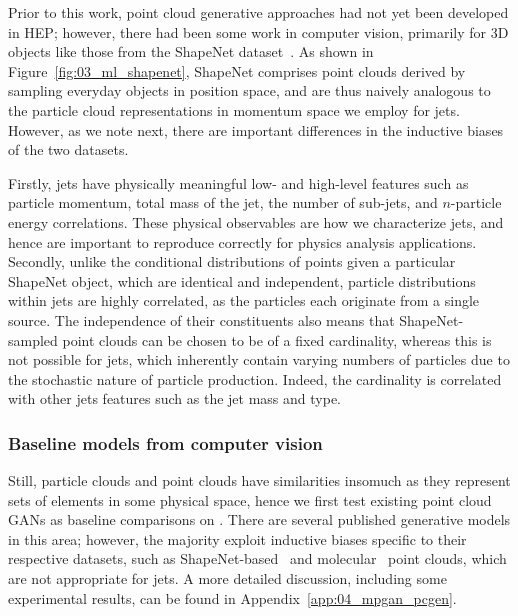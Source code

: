 Prior to this work, point cloud generative approaches had not yet been developed in HEP; however, there had been some work in computer vision, primarily for 3D objects like those from the ShapeNet dataset~\cite{shapenet}.
As shown in Figure~\ref{fig:03_ml_shapenet}, ShapeNet comprises point clouds derived by sampling everyday objects in position space, and are thus naively analogous to the particle cloud representations in momentum space we employ for jets.
However, as we note next, there are important differences in the inductive biases of the two datasets.

Firstly, jets have physically meaningful low- and high-level features such as particle momentum, total mass of the jet, the number of sub-jets, and $n$-particle energy correlations.
These physical observables are how we characterize jets, and hence are important to reproduce correctly for physics analysis applications.
Secondly, unlike the conditional distributions of points given a particular ShapeNet object, which are identical and independent, particle distributions within jets are highly correlated, as the particles each originate from a single source.
The independence of their constituents also means that ShapeNet-sampled point clouds can be chosen to be of a fixed cardinality, whereas this is not possible for jets, which inherently contain varying numbers of particles due to the stochastic nature of particle production.
Indeed, the cardinality is correlated with other jets features such as the jet mass and type.

\subsubsection{Baseline models from computer vision}

Still, particle clouds and point clouds have similarities insomuch as they represent sets of elements in some physical space, hence we first test existing point cloud GANs as baseline comparisons on \jetnet.
There are several published generative models in this area; however, the majority exploit inductive biases specific to their respective datasets, such as ShapeNet-based~\cite{pcgan,pointflow,discretepointflow,ShapeGF} and molecular~\cite{kohler20,simm21,gschnet} point clouds, which are not appropriate for jets.
A more detailed discussion, including some experimental results, can be found in Appendix~\ref{app:04_mpgan_pcgen}.

